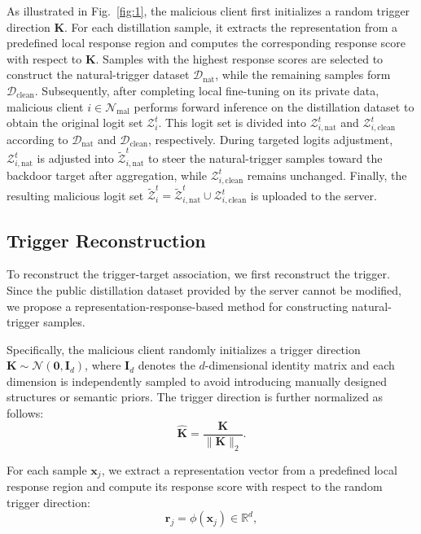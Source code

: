 \documentclass[lettersize,journal]{IEEEtran}
\begin{document}
As illustrated in Fig.~\ref{fig:1}, the malicious client first initializes a random trigger direction \(\mathbf{K}\). For each distillation sample, it extracts the representation from a predefined local response region and computes the corresponding response score with respect to \(\mathbf{K}\).
Samples with the highest response scores are selected to construct the natural-trigger dataset $\mathcal{D}_\mathrm{nat}$, while the remaining samples form $\mathcal{D}_\mathrm{clean}$. 
Subsequently, after completing local fine-tuning on its private data, malicious client \(i\in\mathcal{N}_\mathrm{mal}\) performs forward inference on the distillation dataset to obtain the original logit set \(\mathcal{Z}_i^t\).
This logit set is divided into \(\mathcal{Z}_{i,\mathrm{nat}}^t\) and \(\mathcal{Z}_{i,\mathrm{clean}}^t\) according to \(\mathcal{D}_\mathrm{nat}\) and \(\mathcal{D}_\mathrm{clean}\), respectively.
During targeted logits adjustment, \(\mathcal{Z}_{i,\mathrm{nat}}^t\) is adjusted into \(\widetilde{\mathcal{Z}}_{i,\mathrm{nat}}^t\) to steer the natural-trigger samples toward the backdoor target after aggregation, while \(\mathcal{Z}_{i,\mathrm{clean}}^t\) remains unchanged.
Finally, the resulting malicious logit set \(\widetilde{\mathcal{Z}}_i^t=\widetilde{\mathcal{Z}}_{i,\mathrm{nat}}^t\cup\mathcal{Z}_{i,\mathrm{clean}}^t\) is uploaded to the server.

\subsection{Trigger Reconstruction}

To reconstruct the trigger-target association, we first reconstruct the trigger. 
Since the public distillation dataset provided by the server cannot be modified, we propose a representation-response-based method for constructing natural-trigger samples.

Specifically, the malicious client randomly initializes a trigger direction 
$\mathbf{K}\sim\mathcal{N}(\mathbf{0},\mathbf{I}_d)$, 
where $\mathbf{I}_d$ denotes the $d$-dimensional identity matrix and each dimension is independently sampled to avoid introducing manually designed structures or semantic priors. 
The trigger direction is further normalized as follows:
\begin{equation}
\hat{\mathbf{K}}=
\frac{\mathbf{K}}
{\|\mathbf{K}\|_2}.
\label{eq:normalize_K}
\end{equation}

For each sample $\mathbf{x}_j$, we extract a representation vector from a predefined local response region and compute its response score with respect to the random trigger direction:
\begin{equation}
\mathbf{r}_j=\phi(\mathbf{x}_j)\in\mathbb{R}^{d},
\label{eq:local_representation}
\end{equation}
\end{document}
